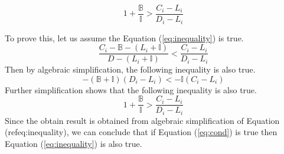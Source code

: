 \begin{equation} \label{eq:cond} 1 + \frac{\mathbb{B}}{\mathbb{I}} > \frac{C_i  - L_i }{D_i - L_i} \end{equation}

To prove this, let us assume the Equation (\ref{eq:inequality}) is true.
\begin{equation} \label{eq:inequality} \frac{C_i - \mathbb{B} - (L_i + \mathbb{I})}{D - (L_i + \mathbb{I})}  < \frac{C_i  - L_i }{D_i - L_i} \end{equation}
Then by algebraic simplification, the following inequality is also true.
$$ - ( \mathbb{B} + \mathbb{I}) (D_i - L_i)  < -\mathbb{I}(C_i  - L_i )$$
Further simplification shows that the following inequality is also true.
$$ 1 + \frac{\mathbb{B}}{\mathbb{I}} > \frac{C_i  - L_i }{D_i - L_i}$$
Since the obtain result is obtained from algebraic simplification of Equation (ref{eq:inequality}), we can conclude that if Equation (\ref{eq:cond}) is true then Equation (\ref{eq:inequality}) is also true.
